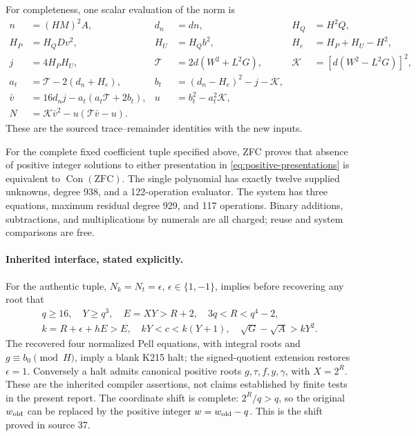 For completeness, one scalar evaluation of the norm is
\begin{align*}
n&=(HM)^2A,&d_n&=dn,&H_Q&=H^2Q,\\
H_P&=H_QDv^2,&H_U&=H_Qb^2,&H_e&=H_P+H_U-H^2,\\
j&=4H_PH_U,&\mathcal T&=2d(W^2+L^2G),&
\mathcal K&=[d(W^2-L^2G)]^2,\\
a_t&=\mathcal T-2(d_n+H_e),&
b_t&=(d_n-H_e)^2-j-\mathcal K,\\
\bar v&=16d_nj-a_t(a_t\mathcal T+2b_t),&
u&=b_t^2-a_t^2\mathcal K,\\
N&=\mathcal K\bar v^2-u(\mathcal T\bar v-u).
\end{align*}
These are the sourced trace--remainder identities with the new inputs.

\begin{theorem}
For the complete fixed coefficient tuple specified above, ZFC proves
that absence of positive integer solutions to either presentation in
\eqref{eq:positive-presentations} is equivalent to \(\operatorname{Con}(\mathrm{ZFC})\).
The single polynomial has exactly twelve supplied unknowns, degree 938,
and a 122-operation evaluator. The system has three equations, maximum
residual degree 929, and 117 operations. Binary additions, subtractions,
and multiplications by numerals are all charged; reuse and system
comparisons are free.
\end{theorem}

\paragraph{Inherited interface, stated explicitly.}
For the authentic tuple, \(N_k=N_t=\epsilon\),
\(\epsilon\in\{1,-1\}\), implies before recovering any root that
\begin{gather*}
q\ge16,\quad Y\ge q^3,\quad E=XY>R+2,\quad
3q<R<q^4-2,\\
k=R+\epsilon+hE>E,\quad kY<c<k(Y+1),\quad
\sqrt G-\sqrt A>kY^2.
\end{gather*}
The recovered four normalized Pell equations, with integral roots and
\(g\equiv b_0\pmod H\), imply a blank K215 halt; the signed-quotient
extension restores \(\epsilon=1\). Conversely a halt admits canonical
positive roots \(g,\tau,f,y,\gamma\), with \(X=2^R\).
These are the inherited compiler assertions, not claims established by
finite tests in the present report. The coordinate shift is complete:
\(2^R/q>q\), so the original \(w_{\rm old}\) can be replaced by the
positive integer \(w=w_{\rm old}-q\). This is the shift proved in source 37.

